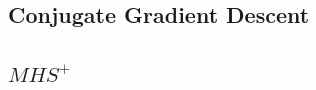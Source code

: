 \begin{appendices}
        \section{Conjugate Gradient Descent} %
        \label{sec:conjugate_gradient_descent}

            \subsection{$MHS^+$} %
            \label{sub:mhs}

                \begin{figure}[H]
                    \centering
                    \begin{subfigure}{0.60\textwidth}
                        \caption{}
                        \label{fig:monks_1_MSE_CGD_MHS}
                    \end{subfigure}
                    \begin{subfigure}{0.60\textwidth}
                        \resizebox{\textwidth}{!}{
}
\end{subfigure}
\end{figure}
\end{appendices}
